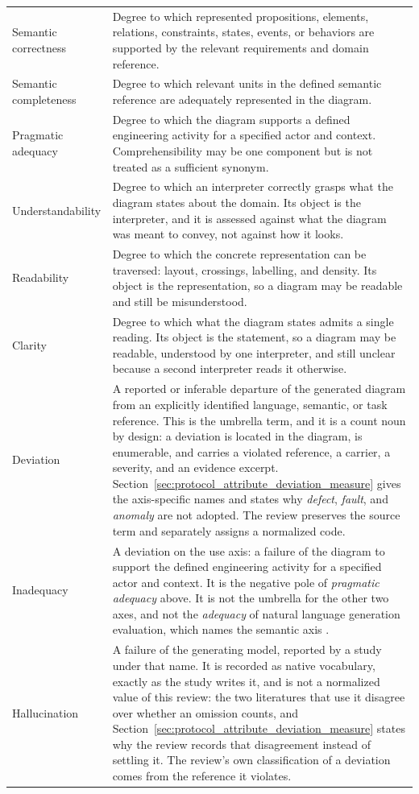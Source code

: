 \begin{longtable}{p{} p{}}
Semantic correctness & Degree to which represented propositions, elements, relations, constraints, states, events, or behaviors are supported by the relevant requirements and domain reference. \\
Semantic completeness & Degree to which relevant units in the defined semantic reference are adequately represented in the diagram. \\
Pragmatic adequacy & Degree to which the diagram supports a defined engineering activity for a specified actor and context. Comprehensibility may be one component but is not treated as a sufficient synonym. \\
Understandability & Degree to which an interpreter correctly grasps what the diagram states about the domain. Its object is the interpreter, and it is assessed against what the diagram was meant to convey, not against how it looks. \\
Readability & Degree to which the concrete representation can be traversed: layout, crossings, labelling, and density. Its object is the representation, so a diagram may be readable and still be misunderstood. \\
Clarity & Degree to which what the diagram states admits a single reading. Its object is the statement, so a diagram may be readable, understood by one interpreter, and still unclear because a second interpreter reads it otherwise. \\
Deviation & A reported or inferable departure of the generated diagram from an explicitly identified language, semantic, or task reference. This is the umbrella term, and it is a count noun by design: a deviation is located in the diagram, is enumerable, and carries a violated reference, a carrier, a severity, and an evidence excerpt. Section~\ref{sec:protocol_attribute_deviation_measure} gives the axis-specific names and states why \textit{defect}, \textit{fault}, and \textit{anomaly} are not adopted. The review preserves the source term and separately assigns a normalized code. \\
Inadequacy & A deviation on the use axis: a failure of the diagram to support the defined engineering activity for a specified actor and context. It is the negative pole of \textit{pragmatic adequacy} above. It is not the umbrella for the other two axes, and not the \textit{adequacy} of natural language generation evaluation, which names the semantic axis \cite{Ji2023Hallucination}. \\
Hallucination & A failure of the generating model, reported by a study under that name. It is recorded as native vocabulary, exactly as the study writes it, and is not a normalized value of this review: the two literatures that use it disagree over whether an omission counts, and Section~\ref{sec:protocol_attribute_deviation_measure} states why the review records that disagreement instead of settling it. The review's own classification of a deviation comes from the reference it violates. \\

\end{longtable}
